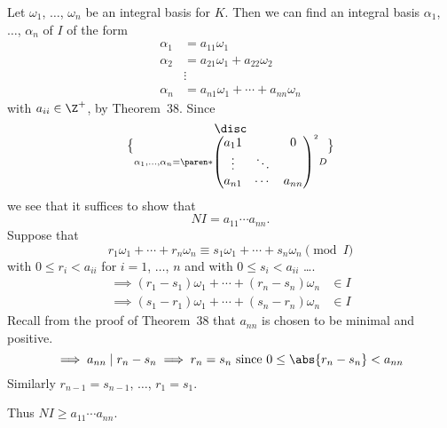 Let $\omega_1$, $\dotsc$, $\omega_n$ be an integral basis for $K$.  Then we can find an integral basis $\alpha_1$, $\dotsc$, $\alpha_n$ of $I$ of the form
\begin{align*}
\alpha_1 &= a_{11} \omega_1 \\
\alpha_2 &= a_{21} \omega_1 + a_{22}\omega_2 \\
&\vdots \\
\alpha_n &= a_{n1} \omega_1 + \dotsb + a_{nn}\omega_n
\end{align*}
with $a_{ii}\in\Z^+$, by Theorem~38.  Since
\[ \disc\brace{\alpha_1,\dotsc,\alpha_n} = \paren*{\begin{pmatrix}
a_11 & & 0 \\
\vdots & \ddots \\
a_{n1} & \cdots & a_{nn}
\end{pmatrix}}^2 D \]
we see that it suffices to show that
\[ NI = a_{11}\dotsm a_{nn} . \]
Suppose that
\[ r_1\omega_1 + \dotsb + r_n\omega_n \equiv s_1\omega_1 + \dotsb + s_n\omega_n \pmod{I} \]
with $0\leq r_i<a_{ii}$ for $i=1$, $\dotsc$, $n$ and with $0\leq s_i<a_{ii}$ \dots.
\begin{align*}
\implies (r_1-s_1)\omega_1 + \dotsb + (r_n-s_n)\omega_n &\in I \\
\implies (s_1-r_1)\omega_1 + \dotsb + (s_n-r_n)\omega_n &\in I
\end{align*}
Recall from the proof of Theorem~38 that $a_{nn}$ is chosen to be minimal and positive.
\[ \implies a_{nn} \mid r_n - s_n \implies r_n = s_n \text{ since } 0\leq\abs{r_n-s_n}<a_{nn} \]
Similarly $r_{n-1}=s_{n-1}$, $\dotsc$, $r_1=s_1$.

Thus $NI \geq a_{11}\dotsm a_{nn}$.
